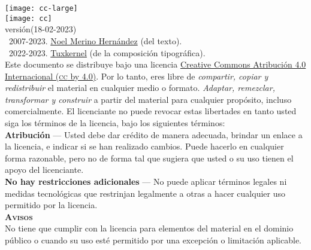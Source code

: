 \documentclass[14pt,twoside,final]{extbook} %
\begin{document}
\clearpage
\newpage
\pagestyle{empty}
\vspace*{0pt}
\vfill
\begin{scriptsize}
\begin{flushleft}
\begin{minipage}{7.5cm}
\texttt{[image: cc-large]}\label{fig:cc-large} \\

\texttt{[image: cc]}\label{fig:cc} \\

\def\fileversion{1.021}
\def\filedate{(18-02-2023)}
versión\space\fileversion\space\filedate \\

\textcopyright\ 2007-2023. \href{noel_merino@yahoo.com.mx}{Noel Merino Hernández} (del texto). \\ \textcopyright\ 2022-2023. \href{muxkernel@gmail.com}{Tuxkernel} (de la composición tipográfica). \\

\noindent Este documento se distribuye bajo una licencia \href{https://creativecommons.org/licenses/by/4.0/deed.es}{Creative Commons Atribución 4.0 Internacional (\textsc{cc} by 4.0)}. Por lo tanto, eres libre de \emph{compartir, copiar y redistribuir} el material en cualquier medio o formato. \emph{Adaptar, remezclar, transformar y construir} a partir del material para cualquier propósito, incluso comercialmente. El licenciante no puede revocar estas libertades en tanto usted siga los términos de la licencia, bajo los siguientes términos: \\

\noindent \textbf{Atribución} --- Usted debe dar crédito de manera adecuada, brindar un enlace a la licencia, e indicar si se han realizado cambios. Puede hacerlo en cualquier forma razonable, pero no de forma tal que sugiera que usted o su uso tienen el apoyo del licenciante. \\

\noindent \textbf{No hay restricciones adicionales} --- No puede aplicar términos legales ni medidas tecnológicas que restrinjan legalmente a otras a hacer cualquier uso permitido por la licencia. \\

\noindent \textbf{\textsc{Avisos}} \\

\noindent No tiene que cumplir con la licencia para elementos del material en el dominio público o cuando su uso esté permitido por una excepción o limitación aplicable. \\


\end{minipage}
\end{flushleft}
\end{scriptsize}
\end{document}
